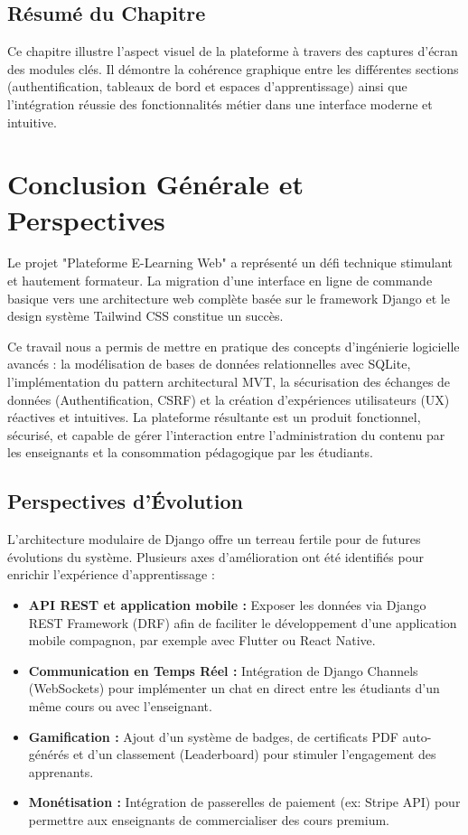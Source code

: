 \documentclass[12pt,a4paper]{report}
\begin{document}
\section*{Résumé du Chapitre}

Ce chapitre illustre l'aspect visuel de la plateforme à travers des captures d'écran des modules clés. Il démontre la cohérence graphique entre les différentes sections (authentification, tableaux de bord et espaces d'apprentissage) ainsi que l'intégration réussie des fonctionnalités métier dans une interface moderne et intuitive.


\chapter*{Conclusion Générale et Perspectives}

Le projet "Plateforme E-Learning Web" a représenté un défi technique stimulant et hautement formateur. La migration d'une interface en ligne de commande basique vers une architecture web complète basée sur le framework Django et le design système Tailwind CSS constitue un succès. 

Ce travail nous a permis de mettre en pratique des concepts d'ingénierie logicielle avancés : la modélisation de bases de données relationnelles avec SQLite, l'implémentation du pattern architectural MVT, la sécurisation des échanges de données (Authentification, CSRF) et la création d'expériences utilisateurs (UX) réactives et intuitives. La plateforme résultante est un produit fonctionnel, sécurisé, et capable de gérer l'interaction entre l'administration du contenu par les enseignants et la consommation pédagogique par les étudiants.

\section*{Perspectives d'Évolution}
L'architecture modulaire de Django offre un terreau fertile pour de futures évolutions du système. Plusieurs axes d'amélioration ont été identifiés pour enrichir l'expérience d'apprentissage :
\begin{itemize}
    \item \textbf{API REST et application mobile :} Exposer les données via Django REST Framework (DRF) afin de faciliter le développement d'une application mobile compagnon, par exemple avec Flutter ou React Native.
    \item \textbf{Communication en Temps Réel :} Intégration de Django Channels (WebSockets) pour implémenter un chat en direct entre les étudiants d'un même cours ou avec l'enseignant.
    \item \textbf{Gamification :} Ajout d'un système de badges, de certificats PDF auto-générés et d'un classement (Leaderboard) pour stimuler l'engagement des apprenants.
    \item \textbf{Monétisation :} Intégration de passerelles de paiement (ex: Stripe API) pour permettre aux enseignants de commercialiser des cours premium.
\end{itemize}
\end{document}
